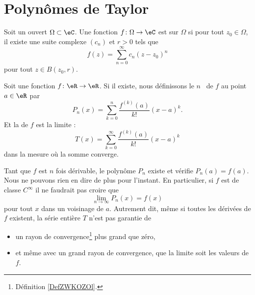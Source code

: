 \section{Polynômes de Taylor}
\label{AppSecTaylorR}

\begin{definition}      \label{DEFooCLGZooRuEkTe}
	Soit un ouvert \( \Omega\subset \eC\). Une fonction \( f\colon \Omega\to \eC\) est  sur \( \Omega\) si pour tout \( z_0\in\Omega\), il existe une suite complexe \( (c_n)\) et \( r>0\) tels que
	\begin{equation}
		f(z)=\sum_{n=0}^{\infty} c_n(z-z_0)^n
	\end{equation}
	pour tout \( z\in B(z_0,r)\).
\end{definition}

\begin{definition}
	Soit une fonction \( f\colon \eR\to \eR\). Si il existe, nous définissons le \( n\)\ieme\  de \( f\) au point \( a\in \eR\) par
	\begin{equation}
		P_n(x)=\sum_{k=0}^n\frac{ f^{(k)}(a) }{ k! }(x-a)^k.
	\end{equation}
	Et la  de \( f\) est la limite :
	\begin{equation}
		T(x)=\sum_{k=0}^{\infty}\frac{ f^{(k)}(a) }{ k! }(x-a)^k
	\end{equation}
	dans la mesure où la somme converge.
\end{definition}

Tant que \( f\) est \( n\) fois dérivable, le polynôme \( P_n\) existe et vérifie \( P_n(a)=f(a)\). Nous ne pouvons rien en dire de plus pour l'instant. En particulier, si \( f\) est de classe \(  C^{\infty}\) il ne faudrait pas croire que
\begin{equation}
	\lim_{n\to \infty} P_n(x)=f(x)
\end{equation}
pour tout \( x\) dans un voisinage de \( a\). Autrement dit, même si toutes les dérivées de \( f\) existent, la série entière \( T\) n'est pas garantie de
\begin{itemize}
	\item
	      un rayon de convergence\footnote{Définition \ref{DefZWKOZOl}.} plus grand que zéro,
	\item
	      et même avec un grand rayon de convergence, que la limite soit les valeurs de \( f\).
\end{itemize}

